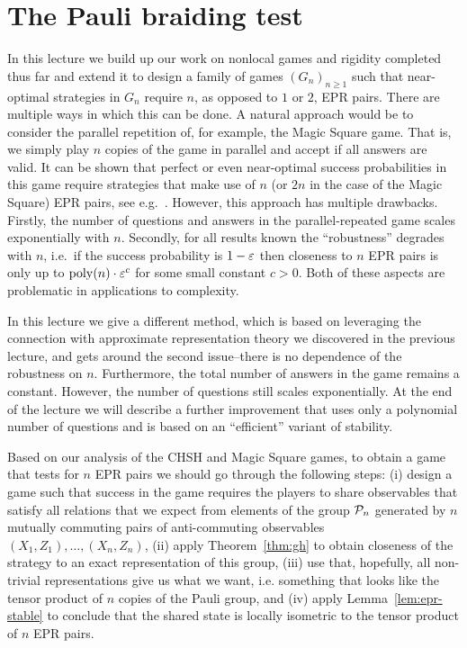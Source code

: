 
\chapter{The Pauli braiding test}

In this lecture we build up our work on nonlocal games and rigidity completed thus far and extend it to design a family of games $(G_n)_{n\geq 1}$ such that near-optimal strategies in $G_n$ require $n$, as opposed to $1$ or $2$, EPR pairs. There are multiple ways in which this can be done. A natural approach would be to consider the parallel repetition of, for example, the Magic Square game. That is, we simply play $n$ copies of the game in parallel and accept if all answers are valid. It can be shown that perfect or even near-optimal success probabilities in this game require strategies that make use of $n$ (or $2n$ in the case of the Magic Square) EPR pairs, see e.g.~\cite{coudron2016parallel}. However, this approach has multiple drawbacks. Firstly, the number of questions and answers in the parallel-repeated game scales exponentially with $n$. Secondly, for all results known the ``robustness'' degrades with $n$, i.e.\ if the success probability is $1-\varepsilon$ then closeness to $n$ EPR pairs is only up to $\operatorname{poly}(n)\cdot \varepsilon^c$ for some small constant $c>0$. Both of these aspects are problematic in applications to complexity. 

In this lecture we give a different method, which is based on leveraging the connection with approximate representation theory we discovered in the previous lecture, and gets around the second issue--there is no dependence of the robustness on $n$. Furthermore, the total number of answers in the game remains a constant. However, the number of questions still scales exponentially. At the end of the lecture we will describe a further improvement that uses only a polynomial number of questions and is based on an ``efficient'' variant of stability. 

Based on our analysis of the CHSH and Magic Square games, to obtain a game that tests for $n$ EPR pairs we should go through the following steps: (i) design a game such that success in the game requires the players to share observables that satisfy all relations that we expect from elements of the group $\mathcal{P}_n$ generated by $n$ mutually commuting pairs of anti-commuting observables $(X_1,Z_1),\ldots,(X_n,Z_n)$, (ii) apply Theorem~\ref{thm:gh} to obtain closeness of the strategy to an exact representation of this group, (iii) use that, hopefully, all non-trivial representations give us what we want, i.e. something that looks like the tensor product of $n$ copies of the Pauli group, and (iv) apply Lemma~\ref{lem:epr-stable} to conclude that the shared state is locally isometric to the tensor product of $n$ EPR pairs. 

